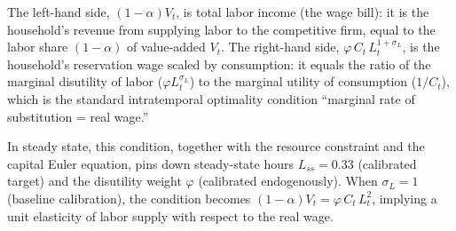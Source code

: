 \documentclass[12pt, a4paper]{article}
\begin{document}
The left-hand side, $(1-\alpha)V_t$, is total labor income (the wage bill): it is the household's revenue from supplying labor to the competitive firm, equal to the labor share $(1-\alpha)$ of value-added $V_t$. The right-hand side, $\varphi\,C_t\,L_t^{1+\sigma_L}$, is the household's reservation wage scaled by consumption: it equals the ratio of the marginal disutility of labor ($\varphi L_t^{\sigma_L}$) to the marginal utility of consumption ($1/C_t$), which is the standard intratemporal optimality condition ``marginal rate of substitution = real wage.''

In steady state, this condition, together with the resource constraint and the capital Euler equation, pins down steady-state hours $L_{ss} = 0.33$ (calibrated target) and the disutility weight $\varphi$ (calibrated endogenously). When $\sigma_L = 1$ (baseline calibration), the condition becomes $(1-\alpha)V_t = \varphi\,C_t\,L_t^2$, implying a unit elasticity of labor supply with respect to the real wage.
\end{document}
